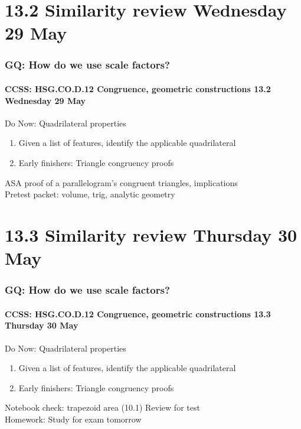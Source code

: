 \documentclass{beamer}
\begin{document}
\section{13.2 Similarity review Wednesday 29 May}
  \frame
  {
    \frametitle{GQ: How do we use scale factors?}
    \framesubtitle{CCSS: HSG.CO.D.12 Congruence, geometric constructions \hfill \alert{13.2 Wednesday 29 May}}

    \begin{block}{Do Now: Quadrilateral properties}
      \begin{enumerate}
        \item Given a list of features, identify the applicable quadrilateral
        \item Early finishers: Triangle congruency proofs
      \end{enumerate}
    \end{block}
    ASA proof of a parallelogram's congruent triangles, implications\\
    Pretest packet: volume, trig, analytic geometry
  }

\section{13.3 Similarity review Thursday 30 May}
  \frame
  {
    \frametitle{GQ: How do we use scale factors?}
    \framesubtitle{CCSS: HSG.CO.D.12 Congruence, geometric constructions \hfill \alert{13.3 Thursday 30 May}}

    \begin{block}{Do Now: Quadrilateral properties}
      \begin{enumerate}
        \item Given a list of features, identify the applicable quadrilateral
        \item Early finishers: Triangle congruency proofs
      \end{enumerate}
    \end{block}
    Notebook check: trapezoid area (10.1)
    Review for test\\[0.5cm]
    Homework: Study for \alert{exam tomorrow}
  }
\end{document}

